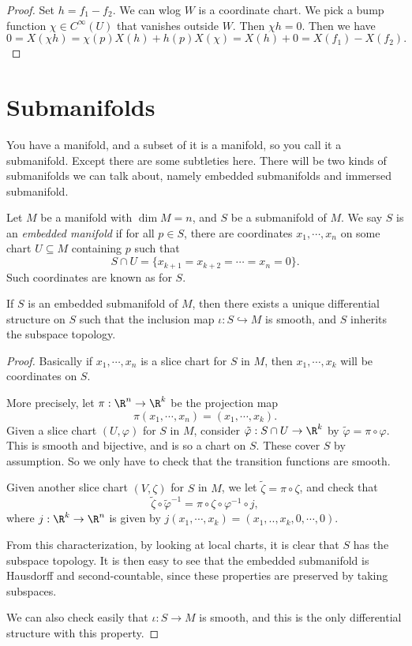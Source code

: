 \documentclass[a4paper]{article}
\begin{document}
\begin{proof}
  Set $h = f_1 - f_2$. We can wlog $W$ is a coordinate chart. We pick a bump function $\chi \in C^\infty(U)$ that vanishes outside $W$. Then $\chi h = 0$. Then we have
  \[
    0 = X(\chi h) = \chi(p) X(h) + h(p) X(\chi) = X(h) + 0 = X(f_1) - X(f_2).
  \]
\end{proof}

\section{Submanifolds}
You have a manifold, and a subset of it is a manifold, so you call it a submanifold. Except there are some subtleties here. There will be two kinds of submanifolds we can talk about, namely embedded submanifolds and immersed submanifold.

\begin{defi}
  Let $M$ be a manifold with $\dim M = n$, and $S$ be a submanifold of $M$. We say $S$ is an \emph{embedded manifold} if for all $p \in S$, there are coordinates $x_1, \cdots, x_n$ on some chart $U \subseteq M$ containing $p$ such that
  \[
    S \cap U = \{x_{k + 1} = x_{k + 2} = \cdots = x_n = 0\}.
  \]
  Such coordinates are known as  for $S$.
\end{defi}

\begin{lemma}
  If $S$ is an embedded submanifold of $M$, then there exists a unique differential structure on $S$ such that the inclusion map $\iota: S \hookrightarrow M$ is smooth, and $S$ inherits the subspace topology.
\end{lemma}

\begin{proof}
  Basically if $x_1, \cdots, x_n$ is a slice chart for $S$ in $M$, then $x_1, \cdots, x_k$ will be coordinates on $S$.

  More precisely, let $\pi: \R^n \to \R^k$ be the projection map
  \[
    \pi(x_1, \cdots, x_n) = (x_1, \cdots, x_k).
  \]
  Given a slice chart $(U, \varphi)$ for $S$ in $M$, consider $\tilde{\varphi}: S \cap U \to \R^k$ by $\tilde{\varphi} = \pi \circ \varphi$. This is smooth and bijective, and is so a chart on $S$. These cover $S$ by assumption. So we only have to check that the transition functions are smooth.

  Given another slice chart $(V, \zeta)$ for $S$ in $M$, we let $\tilde{\zeta} = \pi \circ \zeta$, and check that
  \[
    \tilde{\zeta} \circ \tilde{\varphi}^{-1} = \pi \circ \zeta \circ \varphi^{-1} \circ j,
  \]
  where $j: \R^k \to \R^n$ is given by $j(x_1, \cdots, x_k) = (x_1, .., x_k, 0, \cdots, 0)$.

  From this characterization, by looking at local charts, it is clear that $S$ has the subspace topology. It is then easy to see that the embedded submanifold is Hausdorff and second-countable, since these properties are preserved by taking subspaces.

  We can also check easily that $\iota: S\to M$ is smooth, and this is the only differential structure with this property.
\end{proof}
\end{document}
